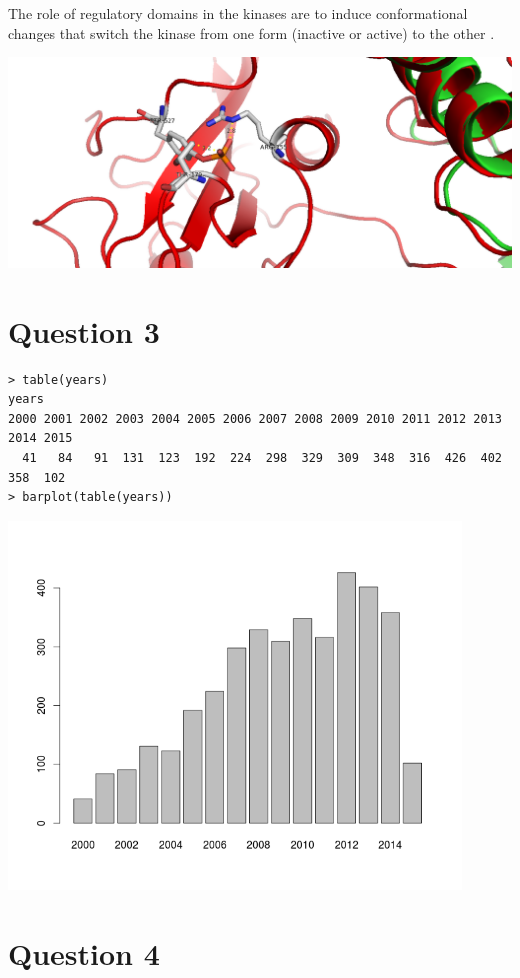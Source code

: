 \documentclass[11pt, a4paper,titlepage]{article}
\begin{document}
The role of regulatory domains in the kinases are to induce
conformational changes that switch the kinase from one form (inactive
or active) to the other \cite{ConformationalPlasticityKinases}.

\includegraphics[width=15cm]{./Figures/2b.png}

\section{Question 3}

\begin{verbatim}
> table(years)
years
2000 2001 2002 2003 2004 2005 2006 2007 2008 2009 2010 2011 2012 2013 2014 2015 
  41   84   91  131  123  192  224  298  329  309  348  316  426  402  358  102 
> barplot(table(years))
\end{verbatim}

\includegraphics[width=12cm]{./Figures/pdb_kinases_growth.png}

\section{Question 4}
\end{document}
